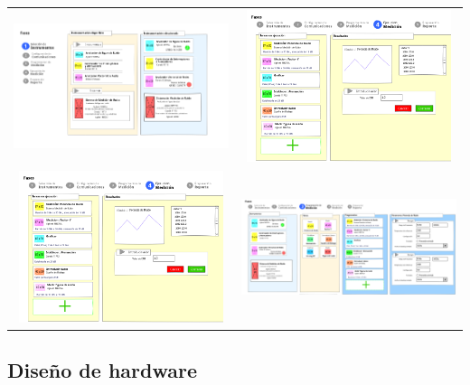 \documentclass[paper=letter,oneside,fontsize=12pt, parskip=full]{article}
\begin{document}
	\begin{table}
		\centering 
		\begin{tabular}{cc}			
			\includegraphics[width=8cm]{Imagenes/InstrumentWindowSketchGui.png} &		
			\includegraphics[width=6cm]{Imagenes/CommunicationsWindowSketchGui.png} \\
			\includegraphics[width=6cm]{Imagenes/ExecutionWindowSketchGui.png} &
			\includegraphics[width=8cm]{Imagenes/ProgramWindowSketchGui.png} 
		\end{tabular}
	\end{table}
	
			
	\subsection{Diseño de hardware}		
	
\end{document}
